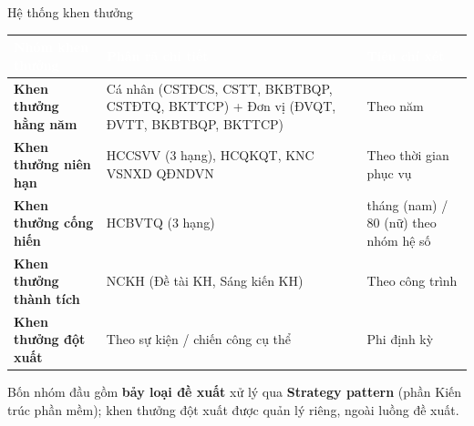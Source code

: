 \documentclass[aspectratio=43,xcolor=table]{beamer}
\newcommand{\highlight}[1]{\textcolor{hustred}{\textbf{#1}}}
\begin{document}
\begin{frame}{Hệ thống khen thưởng}
  \scriptsize
  \begin{tabularx}{\textwidth}{|>{\raggedright\arraybackslash}p{2.8cm}|>{\raggedright\arraybackslash}X|>{\raggedright\arraybackslash}p{2.6cm}|}
    \hline
    \rowcolor{hustred}\textcolor{white}{\textbf{Nhóm khen thưởng}} & \textcolor{white}{\textbf{Phân rã chi tiết}} & \textcolor{white}{\textbf{Tiêu chí xét}} \\ \hline
    \textbf{Khen thưởng hằng năm} & Cá nhân (CSTĐCS, CSTT, BKBTBQP, CSTĐTQ, BKTTCP) + Đơn vị (ĐVQT, ĐVTT, BKBTBQP, BKTTCP) & Theo năm \\ \hline
    \textbf{Khen thưởng niên hạn} & HCCSVV (3 hạng), HCQKQT, KNC VSNXD QĐNDVN & Theo thời gian phục vụ \\ \hline
    \textbf{Khen thưởng cống hiến} & HCBVTQ (3 hạng) & 120 tháng (nam) / 80 (nữ) theo nhóm hệ số \\ \hline
    \textbf{Khen thưởng thành tích} & NCKH (Đề tài KH, Sáng kiến KH) & Theo công trình \\ \hline
    \textbf{Khen thưởng đột xuất} & Theo sự kiện / chiến công cụ thể & Phi định kỳ \\ \hline
  \end{tabularx}

  \vspace{0.4cm}
  \begin{block}{}
    Bốn nhóm đầu gồm \highlight{bảy loại đề xuất} xử lý qua \highlight{Strategy pattern} (phần Kiến trúc phần mềm); khen thưởng đột xuất được quản lý riêng, ngoài luồng đề xuất.
  \end{block}
\end{frame}
\end{document}
